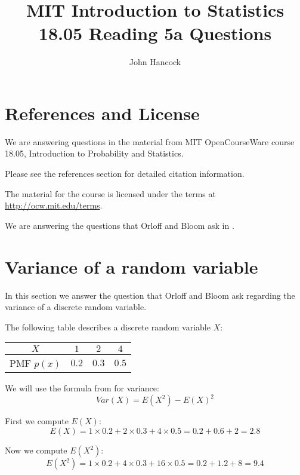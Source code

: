 \documentclass[a4paper,11pt]{article}
\author{John Hancock}
\title{MIT Introduction to Statistics 18.05 Reading 5a Questions}
\begin{document}
\maketitle
\tableofcontents
\section{References and License}
We are answering questions in the material from MIT OpenCourseWare
course 18.05, Introduction to Probability and Statistics.

Please see the references section for detailed citation information.

The material for the course is licensed under the terms at
\url{http://ocw.mit.edu/terms}.

We are answering the questions that Orloff and Bloom ask in
\cite{reading5aQuestions}.

\section{Variance of a random variable}
In this section we answer the question that Orloff and Bloom ask regarding
the variance of a discrete random variable.

The following table describes a discrete random variable $X$:

\begin{center}
\begin{tabular}{ | c | c | c | c|}
    \hline
    $X$ & $1$ & $2$ & $4$ \\ \hline
		PMF $p \left(x \right)$ & $0.2$ & $0.3$ & $0.5$ \\ \hline
\end{tabular}
\end{center}

We will use the formula from \cite{reading5a} for variance:
\begin{equation}\label{varFormula}
	Var \left( X \right) = E \left( X^{2} \right) - E \left( X\right)^{2}
\end{equation}

First we compute $E \left( X \right)$:
\begin{equation}
  E \left( X \right) = 1 \times 0.2 + 2 \times 0.3 + 4 \times 0.5
    = 0.2 + 0.6 + 2 = 2.8
\end{equation}

Now we compute $E \left( X^{2} \right)$:
\begin{equation}
  E \left( X^{2} \right)
    = 1 \times 0.2 + 4 \times 0.3 + 16 \times 0.5
    = 0.2 + 1.2 + 8
    = 9.4
\end{equation}
\end{document}
